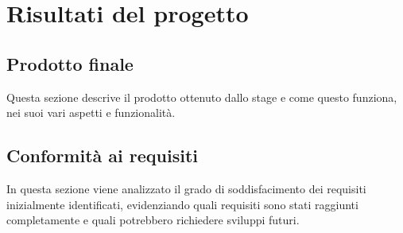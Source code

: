 \section{Risultati del progetto}
\subsection{Prodotto finale}
Questa sezione descrive il prodotto ottenuto dallo stage e come questo funziona, nei suoi vari aspetti e funzionalità.
\subsection{Conformità ai requisiti}
In questa sezione viene analizzato il grado di soddisfacimento dei requisiti inizialmente identificati, evidenziando quali requisiti sono stati raggiunti completamente e quali potrebbero richiedere sviluppi futuri.